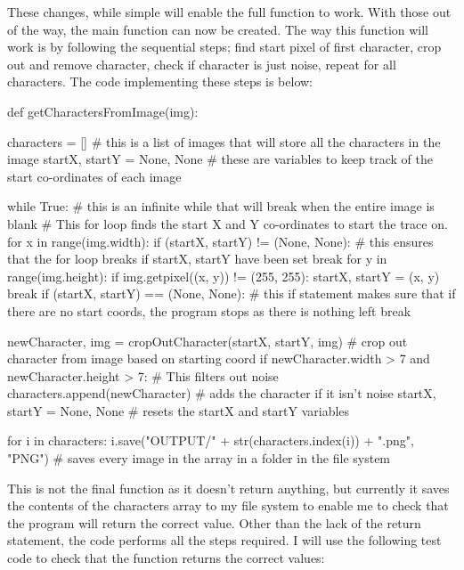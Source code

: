 \documentclass{report}
\begin{document}
These changes, while simple will enable the full function to work. With those out of the way, the main function can now be created.
\newline
The way this function will work is by following the sequential steps; find start pixel of first character, crop out and remove character, check if character is just noise, repeat for all characters.
\newline
The code implementing these steps is below:
\begin{python}
def getCharactersFromImage(img):

    characters = []  # this is a list of images that will store all the characters in the image
    startX, startY = None, None  # these are variables to keep track of the start co-ordinates of each image
    
    while True:  # this is an infinite while that will break when the entire image is blank
        #  This for loop finds the start X and Y co-ordinates to start the trace on.
        for x in range(img.width):
            if (startX, startY) != (None, None):  # this ensures that the for loop breaks if startX, startY have been set
                break
            for y in range(img.height):
                if img.getpixel((x, y)) != (255, 255):
                    startX, startY = (x, y)
                    break
        if (startX, startY) == (None, None):  # this if statement makes sure that if there are no start coords, the program stops as there is nothing left
            break                             

        newCharacter, img = cropOutCharacter(startX, startY, img)  # crop out character from image based on starting coord
        if newCharacter.width > 7 and newCharacter.height > 7:  # This filters out noise
            characters.append(newCharacter)  # adds the character if it isn't noise
        startX, startY = None, None  # resets the startX and startY variables

    for i in characters:
            i.save("OUTPUT/" + str(characters.index(i)) + ".png", "PNG")  # saves every image in the array in a folder in the file system
\end{python}
This is not the final function as it doesn't return anything, but currently it saves the contents of the characters array to my file system to enable me to check that the program will return the correct value. Other than the lack of the return statement, the code performs all the steps required.
\newline
I will use the following test code to check that the function returns the correct values:
\end{document}
